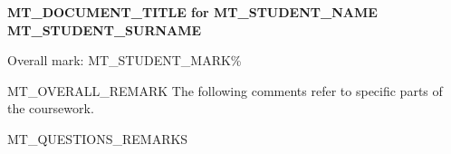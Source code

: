 \documentclass[fleqn,12pt]{article}
\begin{document}
\begin{center}
\Large{\textbf{MT_DOCUMENT_TITLE for MT_STUDENT_NAME MT_STUDENT_SURNAME}}
\end{center}

{\noindent}Overall mark: MT_STUDENT_MARK\%

\vspace*{10pt}
{\noindent}MT_OVERALL_REMARK The following comments refer to specific parts of the coursework.

MT_QUESTIONS_REMARKS
\end{document}
